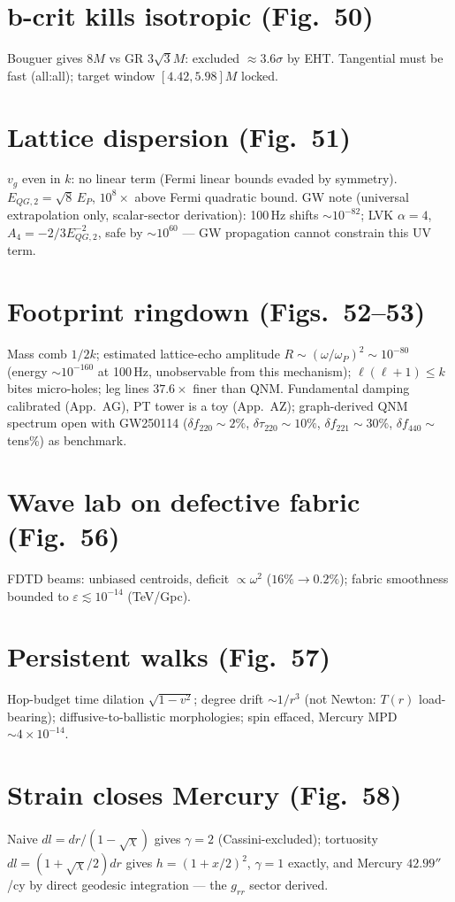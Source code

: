 \documentclass[11pt]{article}
\begin{document}
\section{b-crit kills isotropic (Fig.~50)}
Bouguer gives $8M$ vs GR $3\sqrt{3}M$: excluded $\approx3.6\sigma$ by EHT.
Tangential must be fast (all:all); target window $[4.42,5.98]M$ locked.

\section{Lattice dispersion (Fig.~51)}
$v_g$ even in $k$: no linear term (Fermi linear bounds evaded by symmetry).
$E_{QG,2}=\sqrt8\,E_P$, $10^8\times$ above Fermi quadratic bound.
GW note (universal extrapolation only, scalar-sector derivation):
100\,Hz shifts $\sim10^{-82}$; LVK $\alpha{=}4$,
$A_4{=}-2/3E_{QG,2}^{-2}$, safe by $\sim10^{60}$ — GW propagation
cannot constrain this UV term.

\section{Footprint ringdown (Figs.~52--53)}
Mass comb $1/2k$; estimated lattice-echo amplitude $R\sim(\omega/\omega_P)^2\sim10^{-80}$
(energy $\sim10^{-160}$ at 100\,Hz, unobservable from this mechanism); $\ell(\ell+1)\le k$ bites
micro-holes; leg lines $37.6\times$ finer than QNM. Fundamental damping
calibrated (App.~AG), PT tower is a toy (App.~AZ); graph-derived QNM spectrum
open with GW250114 ($\delta f_{220}\sim2\%$, $\delta\tau_{220}\sim10\%$,
$\delta f_{221}\sim30\%$, $\delta f_{440}\sim$tens\%) as benchmark.

\section{Wave lab on defective fabric (Fig.~56)}
FDTD beams: unbiased centroids, deficit $\propto\omega^2$ ($16\%\to0.2\%$);
fabric smoothness bounded to $\varepsilon\lesssim10^{-14}$ (TeV/Gpc).

\section{Persistent walks (Fig.~57)}
Hop-budget time dilation $\sqrt{1-v^2}$; degree drift $\sim1/r^3$ (not Newton:
$T(r)$ load-bearing); diffusive-to-ballistic morphologies; spin effaced,
Mercury MPD $\sim4\times10^{-14}$.

\section{Strain closes Mercury (Fig.~58)}
Naive $dl=dr/(1-\sqrt\chi)$ gives $\gamma=2$ (Cassini-excluded); tortuosity
$dl=(1+\sqrt\chi/2)dr$ gives $h=(1+x/2)^2$, $\gamma=1$ exactly, and Mercury
$42.99''$/cy by direct geodesic integration — the $g_{rr}$ sector derived.
\end{document}
